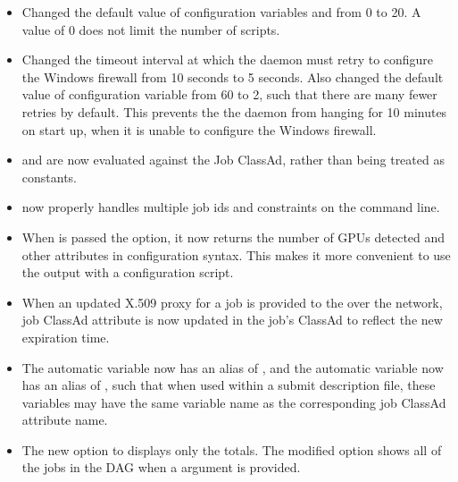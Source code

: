\begin{itemize}
\item Changed the default value of configuration variables
 and 
from 0 to 20.
A value of 0 does not limit the number of scripts.

\item Changed the timeout interval at which the  daemon
must retry to configure the Windows firewall from 10 seconds to 5 seconds.
Also changed the default value of configuration variable
 from 60 to 2,
such that there are many fewer retries by default.
This prevents the the  daemon from hanging for 10 minutes 
on start up,
when it is unable to configure the Windows firewall.

\item {} and 
are now evaluated against the Job ClassAd,
rather than being treated as constants.

\item {} now properly handles multiple job ids and constraints on the command line.

\item When  is passed the  option,
it now returns the number of GPUs detected and other attributes in configuration syntax.
This makes it more convenient to use the output with a configuration script.

\item When an updated X.509 proxy for a job is provided to the
 over the network, 
job ClassAd attribute 
is now updated in the job's ClassAd to reflect the new expiration time.

\item The automatic variable  now has an alias of ,
and the automatic variable  now has an alias 
of ,
such that when used within a submit description file,
these variables may have the same variable name as the corresponding
job ClassAd attribute name.

\item The new  option to  displays only the totals.
The modified  option 
shows all of the jobs in the DAG when a  argument is provided.


\end{itemize}
